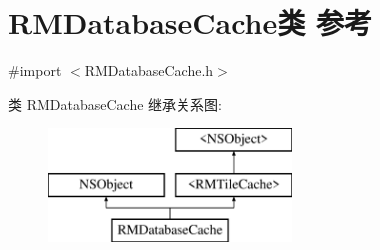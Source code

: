 \hypertarget{interface_r_m_database_cache}{\section{R\-M\-Database\-Cache类 参考}
\label{interface_r_m_database_cache}
}


{\ttfamily \#import $<$R\-M\-Database\-Cache.\-h$>$}

类 R\-M\-Database\-Cache 继承关系图\-:\begin{figure}[H]
\begin{center}
\leavevmode
\includegraphics[height=3.000000cm]{interface_r_m_database_cache}
\end{center}
\end{figure}
